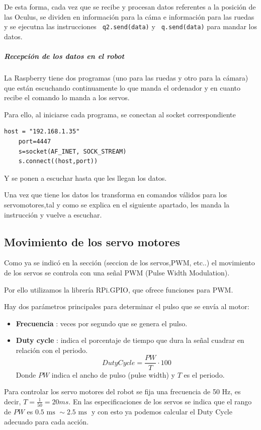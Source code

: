 \documentclass[twoside, 11pt]{epstfg}
\begin{document}
De esta forma, cada vez que se recibe y procesan datos referentes a la posición de las Oculus, se dividen en información para la cáma e información para las ruedas y se ejecutna las instrucciones \texttt{ q2.send(data)}  y \texttt{ q.send(data)} para mandar los datos.
\subparagraph{Recepción de los datos en el robot}

La Raspberry tiene dos programas (uno para las ruedas y otro para la
cámara) que están escuchando continuamente lo que manda el ordenador y en
cuanto recibe el comando lo manda a los servos.

Para ello, al iniciarse cada programa, se conectan al socket correspondiente
\lstset{language=python, breaklines=true, basicstyle=\footnotesize}
\begin{lstlisting}[frame=single]
	host = "192.168.1.35"
	port=4447
	s=socket(AF_INET, SOCK_STREAM)
	s.connect((host,port))
\end{lstlisting}

Y se ponen a escuchar hasta que les llegan los datos.

Una vez que tiene los datos los transforma en comandos válidos para los servomotores,tal y como se explica en el siguiente apartado, les manda la instrucción y vuelve a escuchar.


\subsection{Movimiento de los servo motores}


Como ya se indicó en la sección (seccion de los servos,PWM, etc..) el movimiento de los servos se controla con una señal PWM (Pulse Width Modulation).

Por ello utilizamos la librería RPi.GPIO, que ofrece funciones para PWM.

Hay dos parámetros principales para determinar el pulso que se envía al motor:
\begin{itemize}
	\item \textbf{Frecuencia} : veces por segundo que se genera el pulso.
	\item \textbf{Duty cycle} : indica el porcentaje de tiempo que dura la señal cuadrar en relación con el periodo.
	$$DutyCycle = \frac{PW}{T}\cdot 100$$
	Donde $PW$ indica el ancho de pulso (pulse width) y $T$ es el periodo.
	
\end{itemize}

Para controlar los servo motores del robot se fija una frecuencia de 50 Hz, es decir, $T = \frac{1}{50} = 20 ms$.
En las especificaciones de los servos se indica que el rango de $PW$ es $0.5 \text{ ms } \sim 2.5\text{ ms }$ y con esto ya podemos calcular el Duty Cycle adecuado para cada acción.
\end{document}
